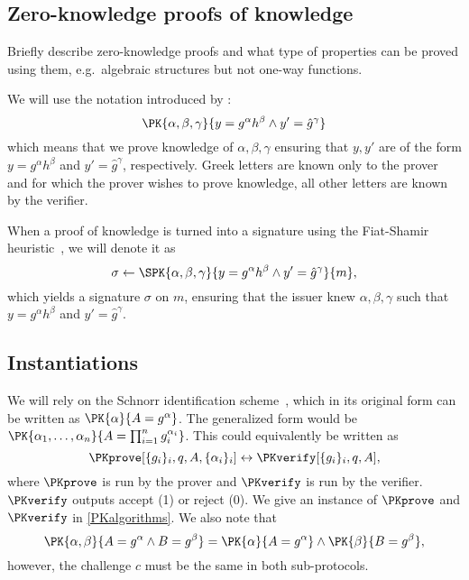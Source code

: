 \subsection{Zero-knowledge proofs of knowledge}%
\label{ZKPK}

Briefly describe zero-knowledge proofs and what type of properties can be proved 
using them, e.g.\ algebraic structures but not one-way functions.

We will use the notation introduced by \citet{PKnotation}:
\begin{equation}\label{PKexample}
  \PK{\alpha, \beta, \gamma}
  {y = g^\alpha h^\beta \land y' = \hat g^\gamma}
\end{equation}
which means that we prove knowledge of \(\alpha, \beta, \gamma\) ensuring that 
\(y, y'\) are of the form \(y = g^\alpha h^\beta\) and \(y' = \hat g^\gamma\), 
respectively.
Greek letters are known only to the prover and for which the prover wishes to 
prove knowledge, all other letters are known by the verifier.

When a proof of knowledge is turned into a signature using the Fiat-Shamir 
heuristic~\cite{FiatShamirHeuristic}, we will denote it as
\begin{equation*}\label{SPKexample}
  \sigma\gets \SPK{\alpha, \beta, \gamma}
  {y = g^\alpha h^\beta \land y' = \hat g^\gamma}
  {m},
\end{equation*}
which yields a signature \(\sigma\) on \(m\), ensuring that the issuer knew 
\(\alpha, \beta, \gamma\) such that \(y = g^\alpha h^\beta\) and \(y' = 
  \hat{g}^\gamma\).


\subsection{Instantiations}


We will rely on the Schnorr identification scheme~\cite{Schnorr}, which in its 
original form can be written as \(\PK{\alpha}{A = g^\alpha}\).
The generalized form would be \(\PK{\alpha_1, \dotsc, \alpha_n}{A = 
    \prod_{i=1}^n g_i^{\alpha_i}}\).
This could equivalently be written as
\begin{equation*}
  \PKprove[\{g_i\}_i, q, A, \{\alpha_i\}_i] \leftrightarrow
  \PKverify[\{g_i\}_i, q, A],
\end{equation*}
where \(\PKprove\) is run by the prover and \(\PKverify\) is run by the 
verifier.
\(\PKverify\) outputs accept (1) or reject (0).
We give an instance of \(\PKprove\) and \(\PKverify\) in \cref{PKalgorithms}.
We also note that
\begin{equation*}
  \PK{\alpha, \beta}{A = g^\alpha \land B = g^\beta} = \PK{\alpha}{A = g^\alpha} 
  \land \PK{\beta}{B = g^\beta},
\end{equation*}
however, the challenge \(c\) must be the same in both sub-protocols.

